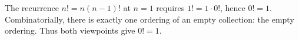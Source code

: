 The recurrence $n!=n(n-1)!$ at $n=1$ requires $1!=1\cdot 0!$, hence $0!=1$. Combinatorially, there is exactly one ordering of an empty collection: the empty ordering. Thus both viewpoints give $\boxed{0!=1}$.
